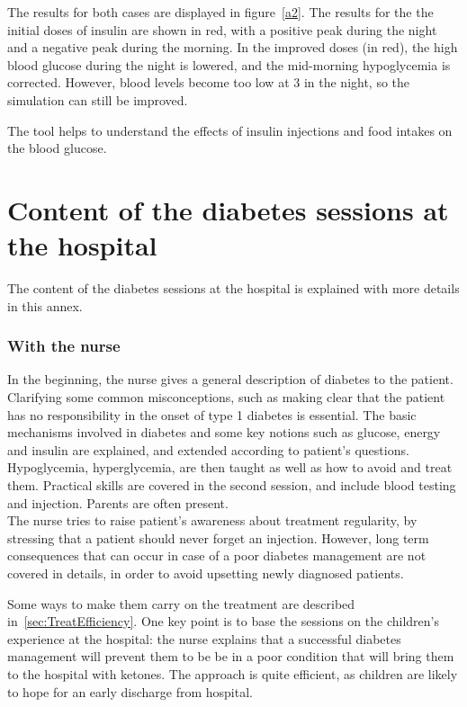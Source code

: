 \documentclass[12pt,MSc]{muthesis}
\begin{document}
The results for both cases are displayed in figure~\ref{a2}. The results for the the initial doses of insulin are shown in red, with a positive peak during the night and a negative peak during the morning. 
In the improved doses (in red), the high blood glucose during the night is lowered, and the mid-morning hypoglycemia is corrected. However, blood levels become too low at 3 in the night, so the simulation can still be improved.

The tool helps to understand the effects of insulin injections and food intakes on the blood glucose.

\chapter{Content of the diabetes sessions at the hospital}
\label{annex:diabetesSessions}
The content of the diabetes sessions at the hospital is explained with more details in this annex.

 \subsection{ With the nurse}
In the beginning, the nurse gives a general description of diabetes to the patient. Clarifying some common misconceptions, such as making clear that the patient has no responsibility in the onset of type 1 diabetes is essential. The basic mechanisms involved in diabetes and some key notions such as glucose, energy and insulin are explained, and extended according to patient's questions. Hypoglycemia, hyperglycemia, are then taught as well as how to avoid and treat them. Practical skills are covered in the second session, and include blood testing and injection. Parents are often present.
\\The nurse tries to raise patient's awareness about treatment regularity, by stressing that a patient should never forget an injection. However, long term consequences that can occur in case of a poor diabetes management are not covered in details, in order to avoid upsetting newly diagnosed patients.

Some ways to make them carry on the treatment are described in~\ref{sec:TreatEfficiency}. One key point is to base the sessions on the children's experience at the hospital: the nurse explains that a successful diabetes management will prevent them to be be in a poor condition that will bring them to the hospital with ketones. The approach is quite efficient, as children are likely to hope for an early discharge from hospital.
\end{document}
